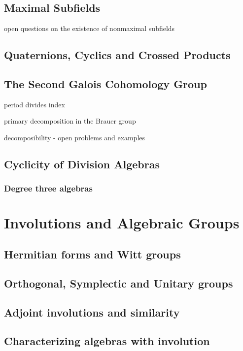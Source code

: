 \documentclass[12pt]{report}
\theoremstyle{plain}
\newcommand{\todo}[1]{\textcolor{todo}{#1}}
\begin{document}
\section{Maximal Subfields}

\todo{open questions on the existence of nonmaximal subfields}

\section{Quaternions, Cyclics and Crossed Products}

\section{The Second Galois Cohomology Group}

\todo{period divides index}

\todo{primary decomposition in the Brauer group}

\todo{decomposibility - open problems and examples}

\section{Cyclicity of Division Algebras}

\subsection{Degree three algebras}


\chapter{Involutions and Algebraic Groups}

\section{Hermitian forms and Witt groups}

\section{Orthogonal, Symplectic and Unitary groups}

\section{Adjoint involutions and similarity}

\section{Characterizing algebras with involution}
\end{document}
